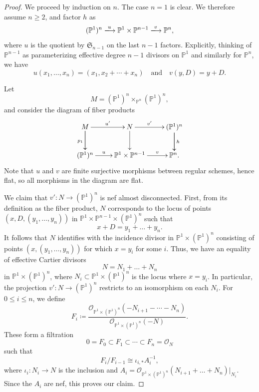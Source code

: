 \documentclass[11pt, reqno]{amsart}
\numberwithin{equation}{section}
\theoremstyle{plain}
\theoremstyle{remark}
\theoremstyle{definition}
\theoremstyle{italicsname}
\newcommand{\cO}{\mathcal{O}}
\newcommand{\fS}{\mathfrak{S}}
\def\PP{\ensuremath{\mathbb{P}}}
\begin{document}
\begin{proof}
We proceed by induction on $n$.
The case $n=1$ is clear.
We therefore assume $n\geq2$, and factor $h$ as
\[
(\PP^1)^n\xlongrightarrow{u}\PP^1\times\PP^{n-1}\xlongrightarrow{v}\PP^n,
\]
where $u$ is the quotient by $\fS_{n-1}$ on the last $n-1$ factors. 
Explicitly, thinking of $\PP^{n-1}$ as parameterizing effective degree $n-1$ divisors on $\PP^1$ and similarly for $\PP^n$, we have 
\begin{equation*}
u(x_1, \dots, x_n) = (x_1, x_2 + \cdots + x_n) \quad \text{and} \quad 
v(y, D) = y + D. 
\end{equation*}

Let 
\[
M = (\PP^1)^n\times_{\PP^n} (\PP^1)^n, 
\]
and consider the diagram of fiber products
\[
\xymatrix{
M\ar[d]_{p_1}\ar[r]^-{u'}\ar[d]& N \ar[r]^-{v'}\ar[d] & (\PP^1)^n \ar[d]\ar[d]^{h}\\
(\PP^1)^n \ar[r]^-{u} & \PP^1\times \PP^{n-1} \ar[r]^-{v}                     & \PP^n.
}
\]
Note that $u$ and $v$ are finite surjective morphisms between regular schemes, hence flat, so all morphisms in the diagram are flat.

We claim that $v'\colon N \to (\PP^1)^n$ is nef almost disconnected. 
First, from its definition as the fiber product, $N$ corresponds to the locus of points $(x, D, (y_1, \dots, y_n))$ in $\PP^1 \times \PP^{n-1} \times (\PP^1)^n$ such that 
\begin{equation*}
    x + D = y_1 + \dots + y_n. 
\end{equation*}
It follows that $N$ identifies with the incidence divisor in $\PP^1 \times (\PP^1)^n$ consisting of points $(x, (y_1, \dots, y_n))$ for which $x = y_i$ for some $i$. Thus, we have an equality of effective Cartier divisors 
\begin{equation*}
    N = N_1 + \dots + N_n
\end{equation*}
in $\PP^1 \times (\PP^1)^n$, where $N_i \subset \PP^1 \times (\PP^1)^n$ is the locus where $x = y_i$. 
In particular, the projection $v' \colon N \to (\PP^1)^n$ restricts to an isomorphism on each $N_i$. 
For $0 \leq i \leq n$, we define 
\begin{equation*}
    F_i \coloneqq \frac{\cO_{\PP^1 \times (\PP^1)^n}(-N_{i+1} - \cdots - N_n)}{\cO_{\PP^1 \times (\PP^1)^n}(-N)}. 
\end{equation*}
These form a filtration 
\begin{equation}
\label{Fi-ON}
    0 = F_0 \subset F_1 \subset \cdots \subset F_n = \cO_{N}
\end{equation}
such that 
\begin{equation*}
    F_i/F_{i-1}\cong \iota_{i,*} A_i^{-1}, 
\end{equation*}
where $\iota_{i} \colon N_i \to N$ is the inclusion and $A_i = \cO_{\PP^1\times (\PP^1)^n}(N_{i+1} +\dots +N_{n})|_{N_i}$. 
Since the $A_i$ are nef, this proves our  claim. 


\end{proof}
\end{document}
